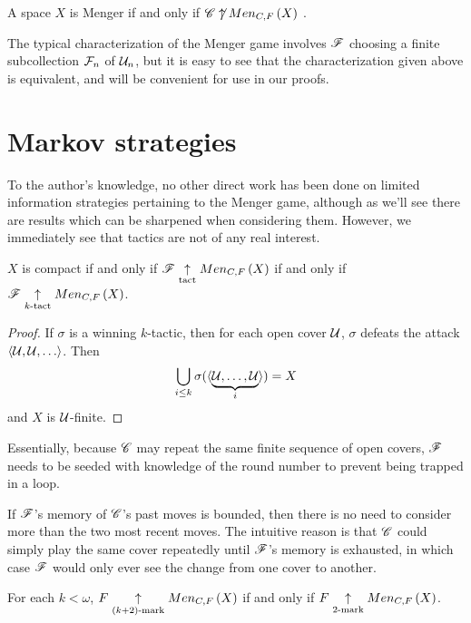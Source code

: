 \begin{thm}
  A space $X$ is Menger if and only if $\mathscr{C}\not\uparrow Men_{C,F}\left({X}\right)$
  \cite{MR1544773}.
\end{thm}

The typical characterization of the Menger game involves $\mathscr{F}$ choosing
a finite subcollection $\mathcal{F}_n$ of $\mathcal{U}_n$, but it is easy to see that the
characterization given above is equivalent, and will be convenient for use
in our proofs.


\section{Markov strategies}

To the author's knowledge, no other direct work has been done on limited
information strategies pertaining to the Menger game, although as we'll see
there are results which can be sharpened when considering them.
However, we immediately see that tactics are not of any real interest.

\begin{prop}
  $X$ is compact if and only if
  $\mathscr{F} \underset{\text{tact}}{\uparrow} Men_{C,F}\left({X}\right)$ if and only if
  $\mathscr{F} \underset{k\text{-tact}}{\uparrow} Men_{C,F}\left({X}\right)$.
\end{prop}

\begin{proof}
  If $\sigma$ is a winning $k$-tactic, then for each open cover $\mathcal{U}$,
  $\sigma$ defeats the attack $\<\mc U,\mc U,\dots\>$. Then
  \[
    \bigcup_{i\leq k} \sigma(\langle\underbrace{\mathcal{U},\dots,\mathcal{U}}_i\rangle) = X
  \]
  and $X$ is $\mathcal{U}$-finite.
\end{proof}

Essentially, because $\mathscr{C}$ may repeat the same finite sequence of open covers,
$\mathscr{F}$ needs to be seeded with knowledge of the round number to prevent being
trapped in a loop.

If $\mathscr{F}$'s memory of $\mathscr{C}$'s past moves is bounded, then
there is no need to consider more than the two most recent moves. The
intuitive reason is that $\mathscr{C}$ could simply play the same cover repeatedly
until $\mathscr{F}$'s memory is exhausted, in which case $\mathscr{F}$ would only ever
see the change from one cover to another.

\begin{thm}
  For each $k<\omega$, $F \underset{(k+2)\text{-mark}}{\uparrow} Men_{C,F}\left({X}\right)$
  if and only if $F \underset{2\text{-mark}}{\uparrow} Men_{C,F}\left({X}\right)$.
\end{thm}

